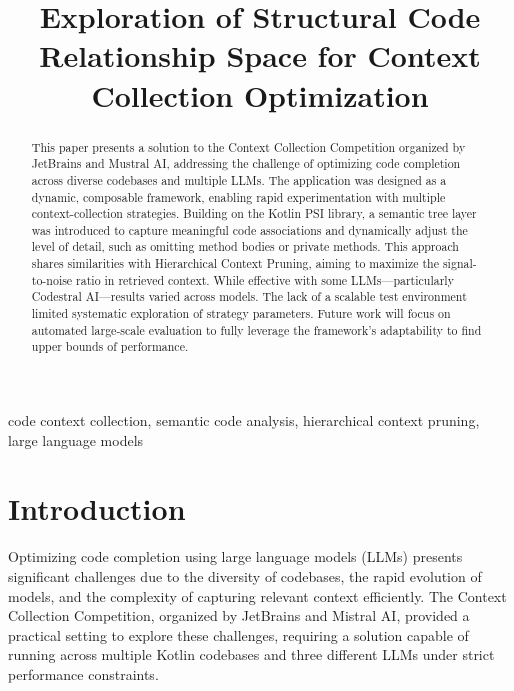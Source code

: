 \documentclass[conference]{IEEEtran}
\begin{document}
\title{Exploration of Structural Code Relationship Space for Context Collection Optimization \\
}

\author{
}

\maketitle
\begin{abstract}
This paper presents a solution to the Context Collection Competition 
organized by JetBrains and Mustral AI, addressing the challenge of optimizing code completion across diverse 
codebases and multiple LLMs. The application was designed as a dynamic, composable framework, enabling rapid
 experimentation with multiple context-collection strategies. Building on the Kotlin PSI library, a semantic
  tree layer was introduced to capture meaningful code associations and dynamically adjust the level of detail, 
  such as omitting method bodies or private methods. This approach shares similarities with Hierarchical Context Pruning, 
  aiming to maximize the signal-to-noise ratio in retrieved context. 
  While effective with some LLMs—particularly Codestral AI—results varied across models. 
The lack of a scalable test environment limited systematic exploration of strategy parameters. 
Future work will focus on automated large-scale evaluation to fully leverage the framework’s adaptability to 
find upper bounds of performance. 
\end{abstract}

\begin{IEEEkeywords}
code context collection, semantic code analysis, hierarchical context pruning, large language models
\end{IEEEkeywords}

\section{Introduction}
Optimizing code completion using large language models (LLMs) presents significant challenges due to the diversity of 
codebases, the rapid evolution of models, and the complexity of capturing relevant context efficiently. The 
Context Collection Competition, organized by JetBrains and Mistral AI, provided a practical setting to explore
 these challenges, requiring a solution capable of running across multiple Kotlin codebases and three different LLMs 
 under strict performance constraints.
\end{document}
